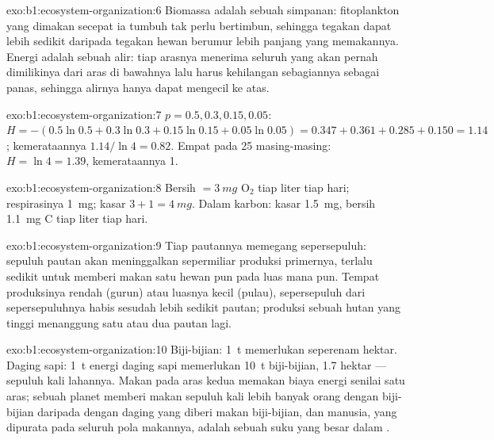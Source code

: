 \begin{solution}{exo:b1:ecosystem-organization:6}
Biomassa adalah sebuah simpanan: fitoplankton yang dimakan secepat ia
tumbuh tak perlu bertimbun, sehingga tegakan  dapat lebih
sedikit daripada tegakan hewan berumur lebih panjang yang memakannya.
Energi adalah sebuah alir: tiap arasnya menerima seluruh yang akan
pernah dimilikinya dari aras di bawahnya lalu harus kehilangan
sebagiannya sebagai panas, sehingga alirnya hanya dapat mengecil ke
atas.
\end{solution}

\begin{solution}{exo:b1:ecosystem-organization:7}
$p = 0.5, 0.3, 0.15, 0.05$: $H = -(0.5\ln 0.5 + 0.3\ln 0.3 + 0.15\ln
0.15 + 0.05\ln 0.05) = 0.347 + 0.361 + 0.285 + 0.150 = 1.14$;
kemerataannya $1.14/\ln 4 = 0.82$. Empat pada 25 masing-masing: $H = \ln 4 = 1.39$,
kemerataannya 1.
\end{solution}

\begin{solution}{exo:b1:ecosystem-organization:8}
Bersih $= \qty{3}{mg}$ $\mathrm{O_2}$ tiap liter tiap hari;
respirasinya \qty{1}{mg}; kasar $3 + 1 = \qty{4}{mg}$. Dalam karbon:
kasar \qty{1.5}{mg}, bersih \qty{1.1}{mg} C tiap liter tiap hari.
\end{solution}

\begin{solution}{exo:b1:ecosystem-organization:9}
Tiap pautannya memegang sepersepuluh: sepuluh pautan akan
meninggalkan sepermiliar produksi primernya, terlalu sedikit untuk
memberi makan satu hewan pun pada luas mana pun. Tempat produksinya
rendah (gurun) atau luasnya kecil (pulau), sepersepuluh dari
sepersepuluhnya habis sesudah lebih sedikit pautan; produksi sebuah
hutan yang tinggi menanggung satu atau dua pautan lagi.
\end{solution}

\begin{solution}{exo:b1:ecosystem-organization:10}
Biji-bijian: \qty{1}{t} memerlukan seperenam hektar. Daging sapi:
\qty{1}{t} energi daging sapi memerlukan \qty{10}{t} biji-bijian,
\num{1.7} hektar --- sepuluh kali lahannya. Makan pada aras kedua
memakan biaya energi senilai satu aras; sebuah planet memberi makan
sepuluh kali lebih banyak orang dengan biji-bijian daripada dengan
daging yang diberi makan biji-bijian, dan  manusia, yang
dipurata pada seluruh pola makannya, adalah sebuah suku yang besar
dalam .
\end{solution}

